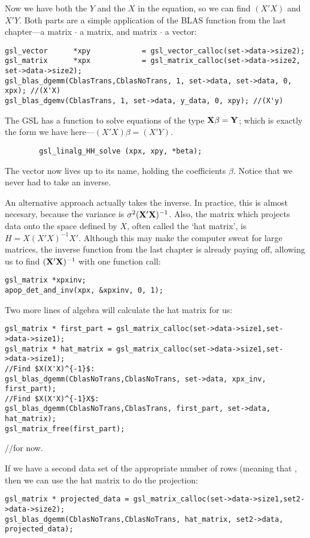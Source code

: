Now we have both the $Y$ and the $X$ in the equation, so we can find $(X'X)$ and $X'Y$.
Both parts are a
simple application of the BLAS function from the last chapter---a matrix $\cdot$ a matrix, and matrix $\cdot$ a vector:
\begin{lstlisting}
gsl_vector      *xpy            = gsl_vector_calloc(set->data->size2);
gsl_matrix      *xpx            = gsl_matrix_calloc(set->data->size2, set->data->size2);
gsl_blas_dgemm(CblasTrans,CblasNoTrans, 1, set->data, set->data, 0, xpx); //(X'X)
gsl_blas_dgemv(CblasTrans, 1, set->data, y_data, 0, xpy); //(X'y)
\end{lstlisting}

The GSL has a function to solve equations of the type ${\bf X} \beta =
{\bf Y}$; which is exactly the form we have here---$(X'X)\beta = (X'Y)$.  \label{ols}
\begin{lstlisting}
        gsl_linalg_HH_solve (xpx, xpy, *beta);
\end{lstlisting}

The vector  now lives up to its name, holding the coefficients
$\beta$. Notice that we never had to take an inverse.  

An alternative approach actually takes the inverse. In practice, this is
almost necesary, because the variance is $\sigma^2 ({\bf X}'{\bf X})^{-1}$.
Also, the matrix which projects data onto the space defined by $X$,
often called the `hat matrix', is $H = X(X'X)^{-1}X'$. Although this may
make the computer sweat for large matrices, the inverse function
from the last chapter is already paying off, allowing us to find
$({\bf X}'{\bf X})^{-1}$ with one function call:
\begin{lstlisting}
gsl_matrix *xpxinv;
apop_det_and_inv(xpx, &xpxinv, 0, 1);
\end{lstlisting}
Two more lines of algebra will calculate the hat matrix for us: 
\lstset{texcl=true}
\begin{lstlisting}
gsl_matrix * first_part = gsl_matrix_calloc(set->data->size1,set->data->size1);
gsl_matrix * hat_matrix = gsl_matrix_calloc(set->data->size1,set->data->size1);
//Find $X(X'X)^{-1}$:
gsl_blas_dgemm(CblasNoTrans,CblasNoTrans, set->data, xpx_inv, first_part);	
//Find $X(X'X)^{-1}X$:
gsl_blas_dgemm(CblasNoTrans,CblasTrans, first_part, set->data, hat_matrix);	
gsl_matrix_free(first_part);
\end{lstlisting}
\lstset{texcl=false}//for now.

If we have a second data set  of the appropriate number of
rows (meaning that , then we can use the hat matrix to do the projection:\\
\begin{lstlisting}
gsl_matrix * projected_data = gsl_matrix_calloc(set->data->size1,set2->data->size2);
gsl_blas_dgemm(CblasNoTrans,CblasNoTrans, hat_matrix, set2->data, projected_data);
\end{lstlisting}





